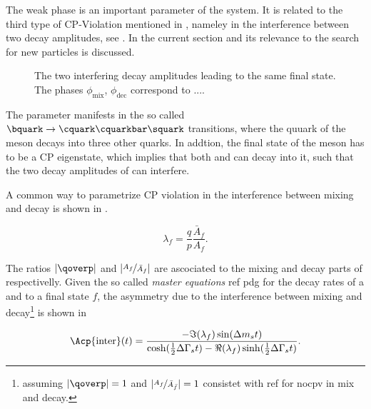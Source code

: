 The weak phase \phis is an important parameter of the \BBbarSyst system. It is related to the third
type of CP-Violation mentioned in , nameley in the interference between
two decay amplitudes, see . In the current section \phis and its relevance to
the search for new particles is discussed.

\newcommand{\ffig}{f}
\newcommand{\phimixfig}{\phi_\text{mix}}
\newcommand{\phifig}{\phi_\text{dec}}
\newcommand{\phibarfig}{\kern 0.15em \overline{\kern -0.15em \phi_\text{dec} \kern -0.60em} \kern 0.60em}
\begin{figure}[h]
  \centering
  \resizebox{0.4\textwidth}{!}{}
  \caption{The two interfering decay amplitudes leading to the same final state.
           The phases $\phimixfig$, $\phifig$ correspond to ....
           }
  \label{interference}
\end{figure}

The parameter \phis manifests in the so called $\bquark \rightarrow \cquark\cquarkbar\squark $ transitions, where the
\bquark quuark of the \Bs meson decays into three other quarks. In addtion, the final state of the \Bs meson has to be
a CP eigenstate, which implies that both \Bs and \Bsb can decay into it, such that the two decay amplitudes of 
can interfere.

A common way to parametrize CP violation in the interference between mixing and decay is shown in .

\begin{equation}
 \lambda_{f} = \frac{q}{p} \frac{\bar{A}_f}{A_f}. %
\label{lambda_cpv}
\end{equation}

\noindent The ratios $|\qoverp|$ and $|\nicefrac{A_f}{\bar{A}_{f}}|$ are ascociated to the mixing and decay parts of  respectivelly.
Given the so called {\it master equations}{\color{red} ref pdg} for the decay rates of a \Bs and \Bsb
to a final state $f$, the \CP asymmetry due to the interference between mixing and decay\footnote{assuming $|\qoverp|=1$ and $|\nicefrac{A_f}{\bar{A}_{\bar{f}}}| = 1$ consistet with {\color{red} ref for nocpv in mix and decay}.}
is shown in 

\newcommand{\half}{\frac{1}{2}}
\begin{equation}
  \Acp{\text{inter}}(t) = \frac{ - \Im(\lambda_f) \sin(\Delta m_s t)} {\cosh(\half \Delta\Gamma_s t) - \Re(\lambda_f)\sinh(\half\Delta\Gamma_s t)}.
\label{cpv_interf}
\end{equation}


